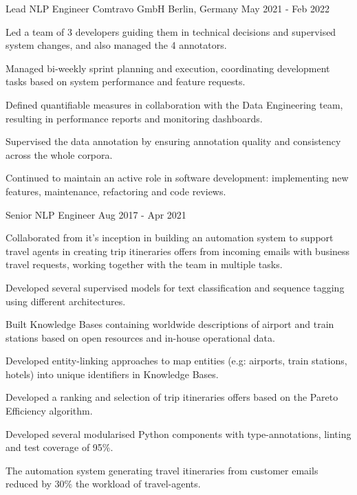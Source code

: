 \begin{cventries}

\cventry
    {Lead NLP Engineer} 
    {Comtravo GmbH} 
    {Berlin, Germany} 
    {May 2021 - Feb 2022}
    {
      \begin{cvitems} 
		  \item {Led a team of 3 developers guiding them in technical decisions and supervised system changes, and also managed the 4 annotators.}
		  \item {Managed bi-weekly sprint planning and execution, coordinating development tasks based on system performance and feature requests.}
		  \item {Defined quantifiable measures in collaboration with the Data Engineering team, resulting in performance reports and monitoring dashboards.}
		  \item {Supervised the data annotation by ensuring annotation quality and consistency across the whole corpora.}
		  \item {Continued to maintain an active role in software development: implementing new features, maintenance, refactoring and code reviews.}
        \end{cvitems}
 	}


  \cventry
    {Senior NLP Engineer}
    {} %
    {} %
    {Aug 2017 - Apr 2021} %
    {
      \begin{cvitems}
		\item {Collaborated from it's inception in building an automation system to support travel agents in creating trip itineraries offers from incoming emails with business travel requests, working together with the team in multiple tasks.}
		\item {Developed several supervised models for text classification and sequence tagging using different architectures.}
		\item {Built Knowledge Bases containing worldwide descriptions of airport and train stations based on open resources and in-house operational data.}
		\item {Developed entity-linking approaches to map entities (e.g: airports, train stations, hotels) into unique identifiers in Knowledge Bases.}
		\item {Developed a ranking and selection of trip itineraries offers based on the Pareto Efficiency algorithm.}
		\item {Developed several modularised Python components with type-annotations, linting and test coverage of 95\%.}
		\item {The automation system generating travel itineraries from customer emails reduced by 30\% the workload of travel-agents.}
        \end{cvitems}
 	}


\end{cventries}
